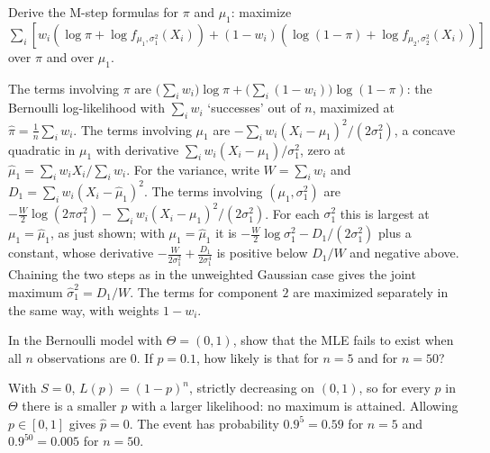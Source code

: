 \begin{exercise}
\label{ex:lik-em-mstep}
Derive the M-step formulas for $\pi$ and $\mu_1$: maximize $\sum_i [w_i(\log\pi + \log f_{\mu_1,\sigma_1^2}(X_i)) + (1 - w_i)(\log(1-\pi) + \log f_{\mu_2,\sigma_2^2}(X_i))]$ over $\pi$ and over $\mu_1$.
\end{exercise}
\begin{solution}
The terms involving $\pi$ are $\big(\sum_i w_i\big)\log\pi + \big(\sum_i (1 - w_i)\big)\log(1 - \pi)$: the Bernoulli log-likelihood with $\sum_i w_i$ `successes' out of $n$, maximized at $\hat{\pi} = \frac1n\sum_i w_i$. The terms involving $\mu_1$ are $-\sum_i w_i (X_i - \mu_1)^2/(2\sigma_1^2)$, a concave quadratic in $\mu_1$ with derivative $\sum_i w_i (X_i - \mu_1)/\sigma_1^2$, zero at $\hat{\mu}_1 = \sum_i w_i X_i / \sum_i w_i$. For the variance, write $W = \sum_i w_i$ and $D_1 = \sum_i w_i (X_i - \hat{\mu}_1)^2$. The terms involving $(\mu_1, \sigma_1^2)$ are $-\frac{W}{2}\log(2\pi\sigma_1^2) - \sum_i w_i(X_i - \mu_1)^2/(2\sigma_1^2)$. For each $\sigma_1^2$ this is largest at $\mu_1 = \hat{\mu}_1$, as just shown; with $\mu_1 = \hat{\mu}_1$ it is $-\frac{W}{2}\log\sigma_1^2 - D_1/(2\sigma_1^2)$ plus a constant, whose derivative $-\frac{W}{2\sigma_1^2} + \frac{D_1}{2\sigma_1^4}$ is positive below $D_1/W$ and negative above. Chaining the two steps as in the unweighted Gaussian case gives the joint maximum $\hat{\sigma}_1^2 = D_1/W$. The terms for component $2$ are maximized separately in the same way, with weights $1 - w_i$.
\end{solution}

\begin{exercise}
\label{ex:lik-boundary}
In the Bernoulli model with $\Theta = (0, 1)$, show that the MLE fails to exist when all $n$ observations are $0$. If $p = 0.1$, how likely is that for $n = 5$ and for $n = 50$?
\end{exercise}
\begin{solution}
With $S = 0$, $L(p) = (1 - p)^n$, strictly decreasing on $(0, 1)$, so for every $p$ in $\Theta$ there is a smaller $p$ with a larger likelihood: no maximum is attained. Allowing $p \in [0, 1]$ gives $\hat{p} = 0$. The event has probability $0.9^5 = 0.59$ for $n = 5$ and $0.9^{50} = 0.005$ for $n = 50$.
\end{solution}
